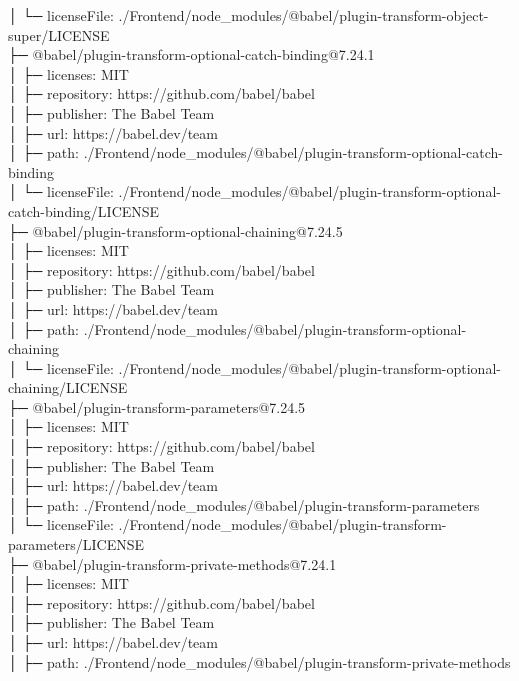 \documentclass[
    paper=a4,
    twoside=false,
    parskip=half,
    listof=entryprefix,
    listof=totoc,
    index=totoc,
    bibliography=totoc,
    headsepline,
]{scrbook}
\begin{document}
    │  └─ licenseFile: ./Frontend/node\_modules/@babel/plugin-transform-object-super/LICENSE\\
    ├─ @babel/plugin-transform-optional-catch-binding@7.24.1\\
    │  ├─ licenses: MIT\\
    │  ├─ repository: https://github.com/babel/babel\\
    │  ├─ publisher: The Babel Team\\
    │  ├─ url: https://babel.dev/team\\
    │  ├─ path: ./Frontend/node\_modules/@babel/plugin-transform-optional-catch-binding\\
    │  └─ licenseFile: ./Frontend/node\_modules/@babel/plugin-transform-optional-catch-binding/LICENSE\\
    ├─ @babel/plugin-transform-optional-chaining@7.24.5\\
    │  ├─ licenses: MIT\\
    │  ├─ repository: https://github.com/babel/babel\\
    │  ├─ publisher: The Babel Team\\
    │  ├─ url: https://babel.dev/team\\
    │  ├─ path: ./Frontend/node\_modules/@babel/plugin-transform-optional-chaining\\
    │  └─ licenseFile: ./Frontend/node\_modules/@babel/plugin-transform-optional-chaining/LICENSE\\
    ├─ @babel/plugin-transform-parameters@7.24.5\\
    │  ├─ licenses: MIT\\
    │  ├─ repository: https://github.com/babel/babel\\
    │  ├─ publisher: The Babel Team\\
    │  ├─ url: https://babel.dev/team\\
    │  ├─ path: ./Frontend/node\_modules/@babel/plugin-transform-parameters\\
    │  └─ licenseFile: ./Frontend/node\_modules/@babel/plugin-transform-parameters/LICENSE\\
    ├─ @babel/plugin-transform-private-methods@7.24.1\\
    │  ├─ licenses: MIT\\
    │  ├─ repository: https://github.com/babel/babel\\
    │  ├─ publisher: The Babel Team\\
    │  ├─ url: https://babel.dev/team\\
    │  ├─ path: ./Frontend/node\_modules/@babel/plugin-transform-private-methods\\
\end{document}
